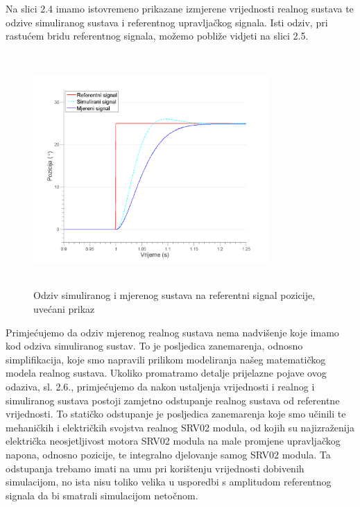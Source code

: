 \documentclass[12pt,a4paper]{article}
\begin{document}
Na slici 2.4 imamo istovremeno prikazane izmjerene vrijednosti realnog sustava te odzive simuliranog sustava i referentnog upravljačkog signala. Isti odziv, pri rastućem bridu referentnog signala, možemo pobliže vidjeti na slici 2.5.

\begin{figure}[h!]
	\begin{center}
	\includegraphics[width=0.8\textwidth, height = 3.5in] {odziv_ref_sim_real_close.png}
    \caption{Odziv simuliranog i mjerenog sustava na referentni signal pozicije, uvećani prikaz}
    \end{center}
\end{figure}

\newpage

Primjećujemo da odziv mjerenog realnog sustava nema nadvišenje koje imamo kod odziva simuliranog sustav. To je posljedica zanemarenja, odnosno simplifikacija, koje smo napravili prilikom modeliranja našeg matematičkog modela realnog sustava. Ukoliko promatramo detalje prijelazne pojave ovog odaziva, sl. 2.6., primjećujemo da nakon ustaljenja vrijednosti i realnog i simuliranog sustava postoji zamjetno odstupanje realnog sustava od referentne vrijednosti. To statičko odstupanje je posljedica zanemarenja koje smo učinili te mehaničkih i električkih svojstva realnog SRV02 modula, od kojih su najizraženija električka neosjetljivost motora SRV02 modula na male promjene upravljačkog napona, odnosno pozicije, te integralno djelovanje samog SRV02 modula. Ta odstupanja trebamo imati na umu pri korištenju vrijednosti dobivenih simulacijom, no ista nisu toliko velika u usporedbi s amplitudom referentnog signala da bi smatrali simulacijom netočnom.
\end{document}
